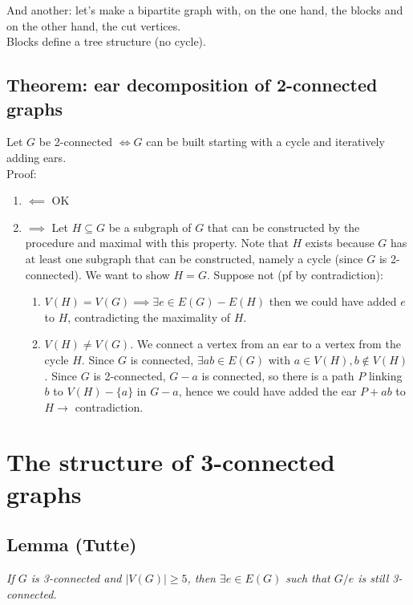 		And another: let's make a bipartite graph with, on the one hand, the blocks and on the other hand, the cut vertices.\\

                Blocks define a tree structure (no cycle).

		\subsection{Theorem: ear decomposition of 2-connected graphs}
		Let $G$ be 2-connected $\iff G$ can be built starting with a cycle and iteratively adding ears.\\
		
		Proof: 
		\begin{enumerate}
			\item $\impliedby$ OK
			\item $\implies$ Let $H \subseteq G$ be a subgraph of $G$ that can be constructed by the procedure and maximal with this property. Note that $H$ exists because $G$ has at least one subgraph that can be constructed, namely a cycle (since $G$ is 2-connected). We want to show $H = G$. Suppose not (pf by contradiction): 
				\begin{enumerate} 
					\item $V(H) = V(G) \implies \exists e \in E(G) - E(H)$ then we could have added $e$ to $H$, contradicting the maximality of $H$.
					\item $V(H) \neq V(G)$. We connect a vertex from an ear to a vertex from the cycle $H$. Since $G$ is connected, $\exists ab \in E(G)$ with $a \in V(H), b \notin V(H)$. Since $G$ is 2-connected, $G-a$ is connected, so there is a path $P$ linking $b$ to $V(H) - \{a\}$ in $G- a$, hence we could have added the ear $P + ab$ to $H \rightarrow$ contradiction. 
				\end{enumerate}
		\end{enumerate}
		
		
	\section{The structure of 3-connected graphs}
		\subsection{Lemma (Tutte)}
		\textit{If $G$ is 3-connected and $|V(G)| \geq 5$, then $\exists e \in E (G)$ such that $G / e$ is still 3-connected.}\\
		
